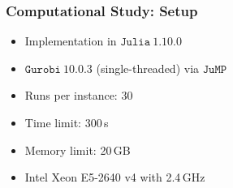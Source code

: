 \documentclass[aspectratio=1610]{beamer}
\let\oldfootnotesize\footnotesize
\renewcommand*{\footnotesize}{\oldfootnotesize\fontsize{6}{4}\selectfont}
\renewcommand{\footnotesize}{\scriptsize}
\begin{document}
  





\begin{frame}
  \frametitle{Computational Study: Setup}  
\begin{itemize}
	\item Implementation in $\mathtt{Julia\ 1.10.0}$
	\item $\mathtt{Gurobi\ 10.0.3}$ (single-threaded) via $\mathtt{JuMP}$
	\item Runs per instance: 30 
	\item Time limit: 300\,s
	\item Memory limit: 20\,GB
	\item Intel Xeon E5-2640 v4 with 2.4\,GHz
\end{itemize}

\end{frame}
\end{document}
